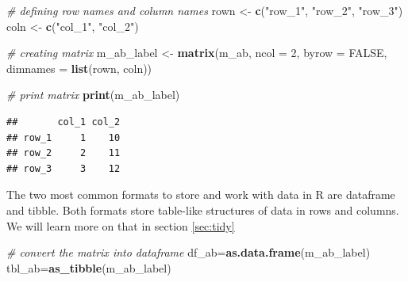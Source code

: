 \documentclass[
  12pt,
  oneside]{book}
\newenvironment{Shaded}{\begin{snugshade}}{\end{snugshade}}
\newcommand{\AttributeTok}[1]{\textcolor[rgb]{0.13,0.29,0.53}{#1}}
\newcommand{\CommentTok}[1]{\textcolor[rgb]{0.56,0.35,0.01}{\textit{#1}}}
\newcommand{\ConstantTok}[1]{\textcolor[rgb]{0.56,0.35,0.01}{#1}}
\newcommand{\DecValTok}[1]{\textcolor[rgb]{0.00,0.00,0.81}{#1}}
\newcommand{\FunctionTok}[1]{\textcolor[rgb]{0.13,0.29,0.53}{\textbf{#1}}}
\newcommand{\NormalTok}[1]{#1}
\newcommand{\OtherTok}[1]{\textcolor[rgb]{0.56,0.35,0.01}{#1}}
\newcommand{\StringTok}[1]{\textcolor[rgb]{0.31,0.60,0.02}{#1}}
\theoremstyle{definition}
\theoremstyle{definition}
\theoremstyle{definition}
\theoremstyle{definition}
\theoremstyle{remark}
\begin{document}
\begin{Shaded}
\begin{Highlighting}[]
\CommentTok{\# defining row names and column names}
\NormalTok{rown }\OtherTok{\textless{}{-}} \FunctionTok{c}\NormalTok{(}\StringTok{"row\_1"}\NormalTok{, }\StringTok{"row\_2"}\NormalTok{, }\StringTok{"row\_3"}\NormalTok{)}
\NormalTok{coln }\OtherTok{\textless{}{-}} \FunctionTok{c}\NormalTok{(}\StringTok{"col\_1"}\NormalTok{, }\StringTok{"col\_2"}\NormalTok{)}

\CommentTok{\# creating matrix}
\NormalTok{m\_ab\_label }\OtherTok{\textless{}{-}} \FunctionTok{matrix}\NormalTok{(m\_ab, }\AttributeTok{ncol =} \DecValTok{2}\NormalTok{, }\AttributeTok{byrow =} \ConstantTok{FALSE}\NormalTok{, }
            \AttributeTok{dimnames =} \FunctionTok{list}\NormalTok{(rown, coln))}
  
\CommentTok{\# print matrix}
\FunctionTok{print}\NormalTok{(m\_ab\_label)}
\end{Highlighting}
\end{Shaded}

\begin{verbatim}
##       col_1 col_2
## row_1     1    10
## row_2     2    11
## row_3     3    12
\end{verbatim}

The two most common formats to store and work with data in R are dataframe and tibble. Both formats store table-like structures of data in rows and columns. We will learn more on that in section \ref{sec:tidy}

\begin{Shaded}
\begin{Highlighting}[]
\CommentTok{\# convert the matrix into dataframe}
\NormalTok{df\_ab}\OtherTok{=}\FunctionTok{as.data.frame}\NormalTok{(m\_ab\_label)}
\NormalTok{tbl\_ab}\OtherTok{=}\FunctionTok{as\_tibble}\NormalTok{(m\_ab\_label)}
\end{Highlighting}
\end{Shaded}
\end{document}
